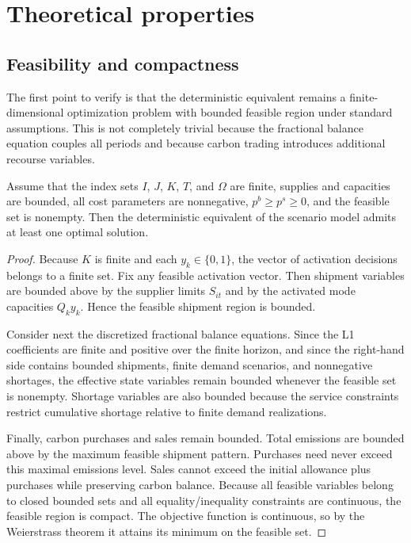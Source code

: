 \section{Theoretical properties}
\subsection{Feasibility and compactness}
The first point to verify is that the deterministic equivalent remains a finite-dimensional optimization problem with bounded feasible region under standard assumptions. This is not completely trivial because the fractional balance equation couples all periods and because carbon trading introduces additional recourse variables.

\begin{theorem}
Assume that the index sets $I$, $J$, $K$, $T$, and $\Omega$ are finite, supplies and capacities are bounded, all cost parameters are nonnegative, $p^b\ge p^s\ge 0$, and the feasible set is nonempty. Then the deterministic equivalent of the scenario model admits at least one optimal solution.
\end{theorem}

\begin{proof}
Because $K$ is finite and each $y_k\in\{0,1\}$, the vector of activation decisions belongs to a finite set. Fix any feasible activation vector. Then shipment variables are bounded above by the supplier limits $S_{it}$ and by the activated mode capacities $Q_k y_k$. Hence the feasible shipment region is bounded.

Consider next the discretized fractional balance equations. Since the L1 coefficients are finite and positive over the finite horizon, and since the right-hand side contains bounded shipments, finite demand scenarios, and nonnegative shortages, the effective state variables remain bounded whenever the feasible set is nonempty. Shortage variables are also bounded because the service constraints restrict cumulative shortage relative to finite demand realizations.

Finally, carbon purchases and sales remain bounded. Total emissions are bounded above by the maximum feasible shipment pattern. Purchases need never exceed this maximal emissions level. Sales cannot exceed the initial allowance plus purchases while preserving carbon balance. Because all feasible variables belong to closed bounded sets and all equality/inequality constraints are continuous, the feasible region is compact. The objective function is continuous, so by the Weierstrass theorem it attains its minimum on the feasible set.
\end{proof}

